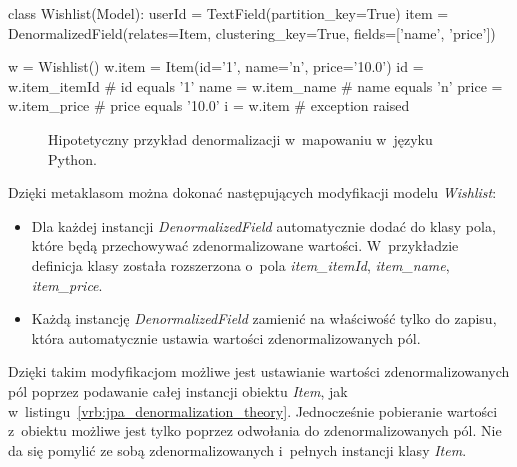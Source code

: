 \begin{verbbox}[\footnotesize]
	class Wishlist(Model):
	    userId = TextField(partition_key=True)
	    item = DenormalizedField(relates=Item, 
	                             clustering_key=True, 
	                             fields=['name', 'price'])

	w = Wishlist()
	w.item = Item(id='1', name='n', price='10.0')
	id = w.item_itemId    # id equals '1'
	name = w.item_name    # name equals 'n'
	price = w.item_price  # price equals '10.0'
	i = w.item            # exception raised
\end{verbbox}

\begin{figure}[ht!]
	\centering
	\theverbbox
	\caption{Hipotetyczny przykład denormalizacji w~mapowaniu w~języku Python.}
	\label{vrb:sql_alchemy_like_denormalization}
\end{figure}

Dzięki metaklasom można dokonać następujących modyfikacji modelu \emph{Wishlist}:

\begin{itemize}
	\item Dla każdej instancji \emph{DenormalizedField} automatycznie dodać do klasy pola, które będą przechowywać zdenormalizowane wartości. W~przykładzie definicja klasy została rozszerzona o~pola \emph{item\_itemId}, \emph{item\_name}, \emph{item\_price}.
	\item Każdą instancję \emph{DenormalizedField} zamienić na właściwość tylko do zapisu, która automatycznie ustawia wartości zdenormalizowanych pól.
\end{itemize}

Dzięki takim modyfikacjom możliwe jest ustawianie wartości zdenormalizowanych pól poprzez podawanie całej instancji obiektu \emph{Item}, jak w~listingu~\ref{vrb:jpa_denormalization_theory}. Jednocześnie pobieranie wartości z~obiektu możliwe jest tylko poprzez odwołania do zdenormalizowanych pól. Nie da się pomylić ze sobą zdenormalizowanych i~pełnych instancji klasy \emph{Item}.